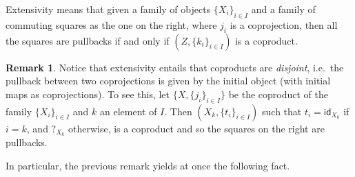 \documentclass[a4paper,UKenglish,cleveref,pdftex,amsthm,thm-restate,numberwithinsect]{cas-sc}
\theoremstyle{plain}
\theoremstyle{definition}
\newtheorem{remark}[theorem]{Remark}
\def\X{\textbf {\textup{X}}}
\newcommand{\id}[1]{\mathsf{id}_{#1}}
\begin{document}
\noindent 
\parbox{11.5cm}{\hspace{15pt} Extensivity means that given a family of objects $\{X_{i}\}_{i\in I}$ and a family of commuting squares as the one on the right, where $j_i$ is a  coprojection, then all the squares are pullbacks if and only if $(Z, \{k_i\}_{i\in I})$ is a coproduct.}\hfill 
\parbox{2cm}{}

\noindent
\parbox{11.5cm}{
\begin{remark}\label{rem:disj}
	Notice that extensivity entails that coproducts are \emph{disjoint}, i.e.~the pullback between two coprojections is given by the initial object (with initial maps as coprojections). To see this, let $\{X, \{j_i\}_{i\in I}\}$ be the coproduct of the family $\{X_i\}_{i\in I}$ and $k$ an element of $I$. Then  $(X_k, \{t_i\}_{i\in I})$ 
such that $t_i = \id{X_k}$ if $i=k$, and $?_{X_k}$ otherwise,
	is a coproduct and so the squares on the right are pullbacks.
\end{remark}}\hfill\parbox{2cm}{ \xymatrix@R=15pt{X_k \ar[r]_{\id{X}} \ar[d]_{\id{X}}& X_k \ar@{>->}[d]^{j_k}\\X_k \ar@{>->}[r]^{j_k} & X}}

In particular, the previous remark yields at once the following fact.
\end{document}
